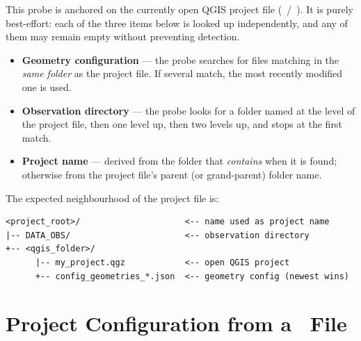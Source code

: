 This probe is anchored on the currently open QGIS project file
(~/~). It is purely best-effort: each of the
three items below is looked up independently, and any of them may remain
empty without preventing detection.

\begin{itemize}
    \item \textbf{Geometry configuration} — the probe searches for files
        matching  in the \emph{same
        folder} as the project file. If several match, the most recently
        modified one is used.

    \item \textbf{Observation directory} — the probe looks for a folder
        named  at the level of the project file, then
        one level up, then two levels up, and stops at the first match.

    \item \textbf{Project name} — derived from the folder that
        \emph{contains}  when it is found; otherwise
        from the project file's parent (or grand-parent) folder name.
\end{itemize}

The expected neighbourhood of the project file is:

\begin{lstlisting}[caption={Expected layout around the QGIS project file.},captionpos=b,frame=lines,basicstyle=\ttfamily\footnotesize]
<project_root>/                     <-- name used as project name
|-- DATA_OBS/                       <-- observation directory
+-- <qgis_folder>/
      |-- my_project.qgz            <-- open QGIS project
      +-- config_geometries_*.json  <-- geometry config (newest wins)
\end{lstlisting}





\section{Project Configuration from a \json~File}
\label{sec-json_config_project}

